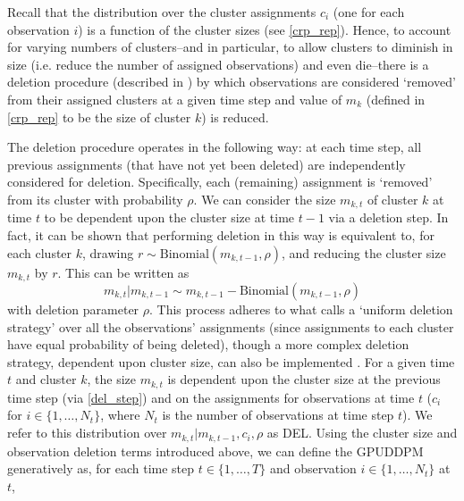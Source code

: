 \documentclass[smallcondensed, final]{svjour3}
\begin{document}
Recall that the distribution over the cluster assignments $c_{i}$ (one for each observation $i$) is a function of the cluster sizes (see \eqref{crp_rep}). Hence, to account for varying numbers of clusters--and in particular, to allow clusters to diminish in size (i.e. reduce the number of assigned observations) and even die--there is a deletion procedure (described in \cite{caron_2007}) by which observations are considered `removed' from their assigned clusters at a given time step and value of $m_{k}$ (defined in \eqref{crp_rep} to be the size of cluster $k$) is reduced.

The deletion procedure operates in the following way: at each time step, all previous assignments (that have not yet been deleted) are independently considered for deletion. Specifically, each (remaining) assignment is `removed' from its cluster with probability $\rho$. We can consider the size $m_{k,t}$ of cluster $k$ at time $t$ to be dependent upon the cluster size at time $t-1$ via a deletion step. In fact, it can be shown that performing deletion in this way is equivalent to, for each cluster $k$, drawing $r \sim \text{Binomial}(m_{k,t-1}, \rho)$, and reducing the cluster size $m_{k,t}$ by $r$. This can be written as 
\begin{equation}
\label{del_step}
m_{k,t} | m_{k,t-1}   \sim   m_{k,t-1}-\text{Binomial}(m_{k,t-1}, \rho)
\end{equation}
with deletion parameter $\rho$. This process adheres to what \cite{caron_2007} calls a `uniform deletion strategy' over all the observations' assignments (since assignments to each cluster have equal probability of being deleted), though a more complex deletion strategy, dependent upon cluster size, can also be implemented \cite{caron_2007}. For a given time $t$ and cluster $k$, the size $m_{k,t}$ is dependent upon the cluster size at the previous time step (via \eqref{del_step}) and on the assignments for observations at time $t$ ($c_{i}$ for $i \in \{ 1, \ldots, N_{t} \}$, where $N_{t}$ is the number of observations at time step $t$). We refer to this distribution over $m_{k,t} | m_{k,t-1}, c_{i}, \rho$ as DEL. Using the cluster size and observation deletion terms introduced above, we can define the GPUDDPM generatively as, for each time step $t \in \{1, \ldots, T\}$ and observation $i \in \{ 1, \ldots, N_{t} \}$ at $t$,
\end{document}

